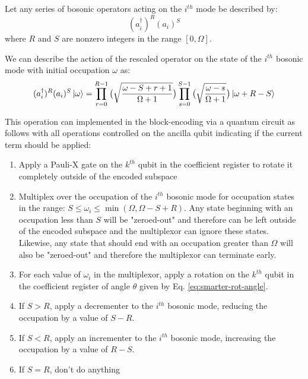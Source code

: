 \begin{tcolorbox}[enhanced,attach boxed title to top center={yshift=-3mm,yshifttext=-1mm}, colback=blue!5!white,colframe=blue!75!black,colbacktitle=orange!80!black, title=Alternative Bosonic Operator Implementation,fonttitle=\bfseries, boxed title style={size=small,colframe=orange!50!black}]

    Let any series of bosonic operators acting on the $i^{th}$ mode be described by:
    \begin{equation}
        (a_i^\dagger)^R (a_i)^S
    \end{equation}
    where $R$ and $S$ are nonzero integers in the range $[0, \Omega]$.

    We can describe the action of the rescaled operator on the state of the $i^{th}$ bosonic mode with initial occupation $\omega$ as:
    \begin{equation}
        (a_i^\dagger)^R (a_i)^S \ket{\omega} = \prod_{r=0}^{R-1} \big( \sqrt{\frac{\omega - S + r + 1}{\Omega + 1}} \big) \prod_{s=0}^{S-1} \big( \sqrt{\frac{\omega - s}{\Omega + 1}} \big) \ket{\omega + R - S}
    \end{equation}

    This operation can implemented in the block-encoding via a quantum circuit as follows with all operations controlled on the ancilla qubit indicating if the current term should be applied:
    \begin{enumerate}
        \item Apply a Pauli-X gate on the $k^{th}$ qubit in the coefficient register to rotate it completely outside of the encoded subspace
        \item Multiplex over the occupation of the $i^{th}$ bosonic mode for occupation states in the range: $S \leq \omega_i \leq \min(\Omega, \Omega - S + R)$. Any state beginning with an occupation less than $S$ will be "zeroed-out" and therefore can be left outside of the encoded subspace and the multiplexor can ignore these states. Likewise, any state that should end with an occupation greater than $\Omega$ will also be "zeroed-out" and therefore the multiplexor can terminate early.
        \item For each value of $\omega_i$ in the multiplexor, apply a rotation on the $k^{th}$ qubit in the coefficient register of angle $\theta$ given by Eq. \ref{eq:smarter-rot-angle}. 
        \item If $S > R$, apply a decrementer to the $i^{th}$ bosonic mode, reducing the occupation by a value of $S - R$.
        \item If $S < R$, apply an incrementer to the $i^{th}$ bosonic mode, increasing the occupation by a value of $R - S$.
        \item If $S = R$, don't do anything
    \end{enumerate}


\end{tcolorbox}
